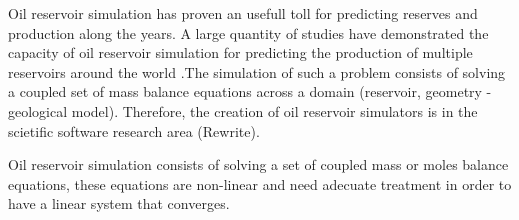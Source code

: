 %
%
%


Oil reservoir simulation has proven an usefull toll for predicting reserves and production along the years. A large quantity of studies have demonstrated the capacity of oil reservoir simulation for predicting the production of multiple reservoirs around the world .The simulation of such a problem consists of solving a coupled set of mass balance equations across a domain (reservoir, geometry - geological model). Therefore, the creation of oil reservoir simulators is in the scietific software research area (Rewrite). 




Oil reservoir simulation consists of solving a set of coupled mass or moles balance equations, these equations are non-linear and need adecuate treatment in order to have a linear system that converges.


